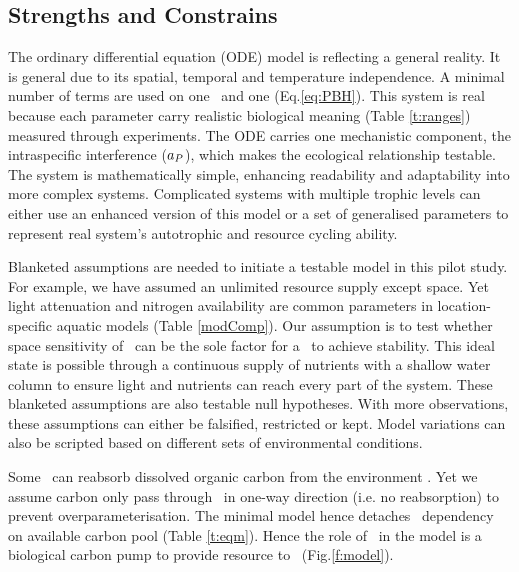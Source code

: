 \documentclass[../thesis.tex]{subfiles} %
\begin{document}
\subsection{Strengths and Constrains}
The ordinary differential equation (ODE) model is reflecting a general reality.  It is general due to its spatial, temporal and temperature independence.  A minimal number of terms are used on one \phy\ and one \bac (Eq.\ref{eq:PBH}).  This system is real because each parameter carry realistic biological meaning (Table \ref{t:ranges}) measured through experiments.  The ODE carries one mechanistic component, the intraspecific interference ($a_P$), which makes the ecological relationship testable.  The system is mathematically simple, enhancing readability and adaptability into more complex systems.  Complicated systems with multiple trophic levels can either use an enhanced version of this model or a set of generalised parameters to represent real system's autotrophic and resource cycling ability.

Blanketed assumptions are needed to initiate a testable model in this pilot study.  For example, we have assumed an unlimited resource supply except space.  Yet light attenuation and nitrogen availability are common parameters in location-specific aquatic models (Table \ref{modComp}).  Our assumption is to test whether space sensitivity of \phy\ can be the sole factor for a \pbs\ to achieve stability.  This ideal state is possible through a continuous supply of nutrients with a shallow water column to ensure light and nutrients can reach every part of the system.  These blanketed assumptions are also testable null hypotheses.  With more observations, these assumptions can either be falsified, restricted or kept.  Model variations can also be scripted based on different sets of environmental conditions.

Some \phy\ can reabsorb dissolved organic carbon from the environment \autocite{j1989respiration,samejima1958heterotrophic}.  Yet we assume carbon only pass through \phy\ in one-way direction (i.e. no reabsorption) to prevent overparameterisation.  The minimal model hence detaches \phy\ dependency on available carbon pool (Table \ref{t:eqm}).  Hence the role of \phy\ in the model is a biological carbon pump to provide resource to \bac\ (Fig.\ref{f:model}).
\end{document}

